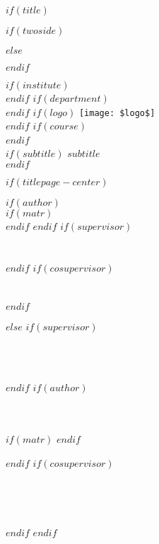 \documentclass[
$if(fontsize)$
  $fontsize$,
$endif$
$if(lang)$
  $babel-lang$,
$endif$
$if(papersize)$
  $papersize$paper,
$endif$
$if(twoside)$
twoside,
$endif$
$if(openright)$
openright,
$endif$
$if(title)$
titlepage,
$endif$
numbers=noenddot,
headinclude,
footinclude,
cleardoublepage=empty,
abstract=on,
BCOR=5mm,
dvipsnames,
$for(classoption)$
  $classoption$$sep$,
$endfor$
]{scrreport}
\begin{document}

$if(title)$
\begin{titlepage}
$if(twoside)$
\begin{addmargin}[-1cm]{-3.4cm}
$else$
\begin{addmargin}[-2.5cm]{-2cm}
$endif$
\pagestyle{plain}
\begin{center}
\Large

$if(institute)$
 \\
$endif$
$if(department)$
 \\
$endif$
$if(logo)$
\vfill
\texttt{[image: \$logo\$]} \\ \medskip
$endif$
$if(course)$			
 \\
$endif$
\vfill
\begingroup
\color{CTtitle} \\ \bigskip
\endgroup
$if(subtitle)$
\medskip
\textit{$subtitle$} \\
$endif$
\end{center}
\vfill

$if(titlepage-center)$
\begin{center}
$if(author)$
 \\
$if(matr)$
 \\
$endif$
$endif$
\vfill
$if(supervisor)$
\\
\\
\\
$endif$
$if(cosupervisor)$
\vfill
{}\\
\\
\\
$endif$
\end{center}
$else$
$if(supervisor)$
\begin{minipage}{2in}
\\
\\
\end{minipage}
$endif$
$if(author)$
\hfill
\begin{minipage}{1.5in}
\\
\\
$if(matr)$
$endif$
\end{minipage}
$endif$
$if(cosupervisor)$
\\
\\
\\
\\
\\
$endif$
$endif$


\end{addmargin}
\end{addmargin}
\end{titlepage}
\end{document}
